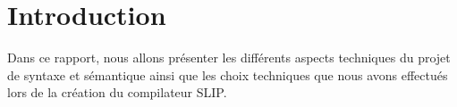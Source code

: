 \section{Introduction}

Dans ce rapport, nous allons présenter les différents aspects techniques du projet de syntaxe et sémantique ainsi que les choix techniques que nous avons effectués lors de la création du compilateur SLIP.
